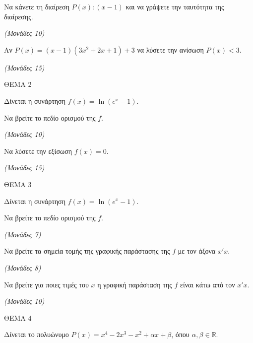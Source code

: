 \documentclass[11pt,a4paper,twoside]{book}
\newcommand{\monades}[1]{\hfill \textit{(Μονάδες #1)}}
\begin{document}
\begin{alist}
\item Να κάνετε τη διαίρεση $P(x) : (x - 1)$ και να γράψετε την ταυτότητα της διαίρεσης.

\monades{10}

\item Αν $P(x) = (x - 1)(3x^2 + 2x + 1) + 3$ να λύσετε την ανίσωση $P(x) < 3$.

\monades{15}
\end{alist}

\vspace{4mm}

ΘΕΜΑ 2

Δίνεται η συνάρτηση $f(x) = \ln(e^x - 1)$.

\begin{alist}
\item Να βρείτε το πεδίο ορισμού της $f$.

\monades{10}

\item Να λύσετε την εξίσωση $f(x) = 0$.

\monades{15}
\end{alist}

\vspace{4mm}

ΘΕΜΑ 3

Δίνεται η συνάρτηση $f(x) = \ln(e^x - 1)$.

\begin{alist}
\item Να βρείτε το πεδίο ορισμού της $f$.

\monades{7}

\item Να βρείτε τα σημεία τομής της γραφικής παράστασης της $f$ με τον άξονα $x'x$.

\monades{8}

\item Να βρείτε για ποιες τιμές του $x$ η γραφική παράσταση της $f$ είναι κάτω από τον $x'x$.

\monades{10}
\end{alist}

\vspace{4mm}

ΘΕΜΑ 4

Δίνεται το πολυώνυμο $P(x) = x^4 - 2x^3 - x^2 + \alpha x + \beta$, όπου $\alpha, \beta \in \mathbb{R}$.
\end{document}
